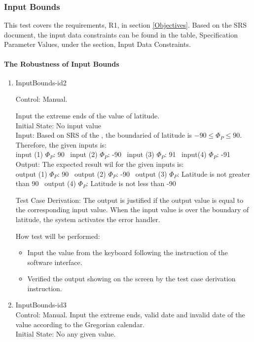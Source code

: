 \documentclass[12pt, titlepage]{article}
\begin{document}
\subsubsection{Input Bounds}

This test covers the requirements, R1, in section \ref{Objectives}. Based on
the SRS document\cite{YS2019}, the input data constraints can be found in the
table, Specification Parameter Values, under the section, Input Data
Constraints.


\paragraph{The Robustness of Input Bounds} 
\begin{enumerate}
\item{InputBounds-id2\\} 

Control: Manual. 

Input the extreme ends of the value of latitude.\\
Initial State: No input value\\
Input: Based on SRS\cite{YS2019} of the \progname\cite{YS2019}, the boundaried
of latitude is $-90 \leq \Phi_P \leq 90$.\\
Therefore, the given inputs is:\\
input (1) $\Phi_P$: 90 
~input (2) $\Phi_P$: -90 
~input (3) $\Phi_P$: 91 
~input(4) $\Phi_P$: -91\\ 

Output: The expected result wil for the given inputs is:\\
output (1) $\Phi_P$: 90 
~output (2) $\Phi_P$: -90 
~output (3) $\Phi_P$: Latitude is not greater than 90 
~output (4) $\Phi_P$: Latitude is not less than -90\\


Test Case Derivation: The output is justified if the output value is equal to
the corresponding input value. When the input value is over the boundary 
of latitude, the system activates the error handler. \\ 

How test will be performed:

\begin{itemize} 

\item Input the value from the keyboard following the instruction of the
software interface.
\item Verified the output showing on the screen by the test case derivation
instruction.
\end{itemize}
\item{InputBounds-id3\\}
Control: Manual. 
 Input the extreme ends, valid date and invalid date of the value according to the Gregorian calendar. \\
Initial State: No any given value.\\


\end{enumerate}
\end{document}

